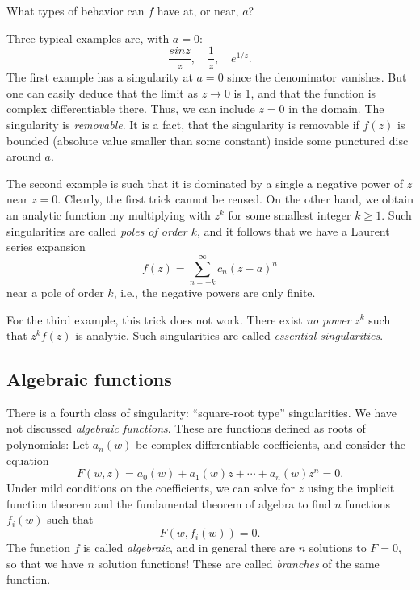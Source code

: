 What types of behavior can $f$ have at, or near,  $a$?

Three typical examples are, with $a=0$:
\begin{equation}
    \frac{sin z}{z}, \quad \frac{1}{z}, \quad e^{1/z}.
\end{equation}
The first example has a singularity at $a=0$ since the denominator vanishes. But one can easily deduce that the limit as $z\to 0$ is 1, and that the function is complex differentiable there. Thus, we can include $z=0$ in the domain. The singularity is \emph{removable}. It is a fact, that the singularity is removable if $f(z)$ is bounded (absolute value smaller than some constant) inside some punctured disc around $a$.

The second example is such that it is dominated by a single a negative power of $z$ near $z=0$. Clearly, the first trick cannot be reused. On the other hand, we obtain an analytic function my multiplying with $z^k$ for some smallest integer $k\geq 1$. Such singularities are called \emph{poles of order $k$}, and it follows that we have a Laurent series expansion
\[ f(z) = \sum_{n = -k}^\infty c_n (z-a)^n \]
near a pole of order $k$, i.e., the negative powers are only finite.

For the third example, this trick does not work. There exist \emph{no power} $z^k$ such that $z^k f(z)$ is analytic. Such singularities are called \emph{essential singularities}. 

\subsection{Algebraic functions}

There is a fourth class of singularity: ``square-root type'' singularities. We have not discussed \emph{algebraic functions}. These are functions defined as roots of polynomials: Let $a_n(w)$ be complex differentiable coefficients, and consider the equation
\begin{equation}
    F(w,z) = a_0(w) + a_1(w)z + \cdots + a_n(w) z^n = 0.
\end{equation}
Under mild conditions on the coefficients, we can solve for $z$ using the implicit function theorem and the fundamental theorem of algebra to find $n$ functions $f_i(w)$ such that
\begin{equation}
    F(w,f_i(w)) = 0.
\end{equation}
The function $f$ is called \emph{algebraic}, and in general there are $n$ solutions to $F=0$, so that we have $n$ solution functions! These are called \emph{branches} of the same function.

